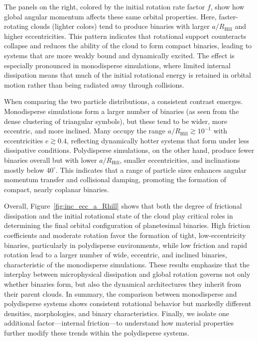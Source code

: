 \documentclass[fleqn,usenatbib]{mnras}
\begin{document}
The panels on the right, colored by the initial rotation rate factor $f$, show how global angular momentum affects these same orbital properties. Here, faster-rotating clouds (lighter colors) tend to produce binaries with larger $a/R_{\mathrm{Hill}}$ and higher eccentricities. This pattern indicates that rotational support counteracts collapse and reduces the ability of the cloud to form compact binaries, leading to systems that are more weakly bound and dynamically excited. The effect is especially pronounced in monodisperse simulations, where limited internal dissipation means that much of the initial rotational energy is retained in orbital motion rather than being radiated away through collisions.

When comparing the two particle distributions, a consistent contrast emerges. Monodisperse simulations form a larger number of binaries (as seen from the dense clustering of triangular symbols), but these tend to be wider, more eccentric, and more inclined. Many occupy the range $a/R_{\mathrm{Hill}} \gtrsim 10^{-1}$ with eccentricities $e \gtrsim 0.4$, reflecting dynamically hotter systems that form under less dissipative conditions. Polydisperse simulations, on the other hand, produce fewer binaries overall but with lower $a/R_{\mathrm{Hill}}$, smaller eccentricities, and inclinations mostly below $40^\circ$. This indicates that a range of particle sizes enhances angular momentum transfer and collisional damping, promoting the formation of compact, nearly coplanar binaries.

Overall, Figure~\ref{fig:inc_ecc_a_Rhill} shows that both the degree of frictional dissipation and the initial rotational state of the cloud play critical roles in determining the final orbital configuration of planetesimal binaries. High friction coefficients and moderate rotation favor the formation of tight, low-eccentricity binaries, particularly in polydisperse environments, while low friction and rapid rotation lead to a larger number of wide, eccentric, and inclined binaries, characteristic of the monodisperse simulations. These results emphasize that the interplay between microphysical dissipation and global rotation governs not only whether binaries form, but also the dynamical architectures they inherit from their parent clouds.
In summary, the comparison between monodisperse and polydisperse systems shows consistent rotational behavior but markedly different densities, morphologies, and binary characteristics. Finally, we isolate one additional factor—internal friction—to understand how material properties further modify these trends within the polydisperse systems.
\end{document}
